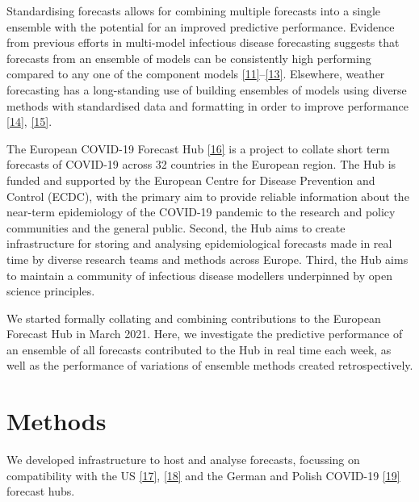 \documentclass[
]{article}
\begin{document}
Standardising forecasts allows for combining multiple forecasts into a
single ensemble with the potential for an improved predictive
performance. Evidence from previous efforts in multi-model infectious
disease forecasting suggests that forecasts from an ensemble of models
can be consistently high performing compared to any one of the component
models
\protect\hyperlink{ref-reichAccuracyRealtimeMultimodel2019}{{[}11{]}}--\protect\hyperlink{ref-viboudRAPIDDEbolaForecasting2018}{{[}13{]}}.
Elsewhere, weather forecasting has a long-standing use of building
ensembles of models using diverse methods with standardised data and
formatting in order to improve performance
\protect\hyperlink{ref-buizzaIntroductionSpecialIssue2019}{{[}14{]}},
\protect\hyperlink{ref-moranEpidemicForecastingMessier2016}{{[}15{]}}.

The European COVID-19 Forecast Hub
\protect\hyperlink{ref-europeancovid-19forecasthubEuropeanCOVID19Forecast2021}{{[}16{]}}
is a project to collate short term forecasts of COVID-19 across 32
countries in the European region. The Hub is funded and supported by the
European Centre for Disease Prevention and Control (ECDC), with the
primary aim to provide reliable information about the near-term
epidemiology of the COVID-19 pandemic to the research and policy
communities and the general public. Second, the Hub aims to create
infrastructure for storing and analysing epidemiological forecasts made
in real time by diverse research teams and methods across Europe. Third,
the Hub aims to maintain a community of infectious disease modellers
underpinned by open science principles.

We started formally collating and combining contributions to the
European Forecast Hub in March 2021. Here, we investigate the predictive
performance of an ensemble of all forecasts contributed to the Hub in
real time each week, as well as the performance of variations of
ensemble methods created retrospectively.

\hypertarget{methods}{%
\section{Methods}\label{methods}}

We developed infrastructure to host and analyse forecasts, focussing on
compatibility with the US
\protect\hyperlink{ref-cramerReichlabCovid19forecasthubRelease2021}{{[}17{]}},
\protect\hyperlink{ref-wangReichlabCovidHubUtilsRepository2021}{{[}18{]}}
and the German and Polish COVID-19
\protect\hyperlink{ref-bracherGermanPolishCOVID192020}{{[}19{]}}
forecast hubs.
\end{document}
